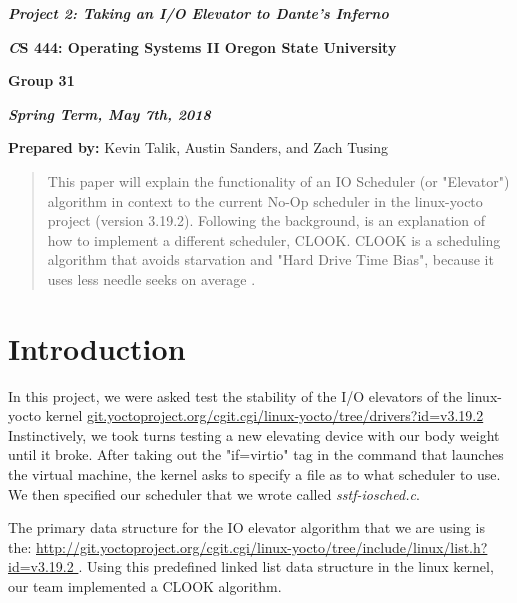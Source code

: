\documentclass[onecolumn, draftclsnofoot,10pt, compsoc]{IEEEtran}
\def \ClassName{		CS 444: Operating Systems II }
\def \TeamNumber{		Group 31}
\def \GroupMemberOne{			Kevin Talik}
\def \GroupMemberTwo{			Austin Sanders}
\def \GroupMemberThree{			Zach Tusing}
\begin{document}
 	\begin{center}
	\huge\bf{ } 
   
    \large\textbf{\textit{ Project 2: Taking an I/O Elevator to Dante's Inferno }}\par
     
    
    
	\small{\bf\textit \ClassName Oregon State University}\par
    \small{\bf{\TeamNumber}}
    
    
    {\bf\textit{ Spring Term, May 7th, 2018} }
    
    
    {\small {\bf Prepared by:} \GroupMemberOne, \GroupMemberTwo, and \GroupMemberThree }
        \end{center}
 		\vfill
		\begin{abstract}
        This paper will explain the functionality of an IO Scheduler (or "Elevator") algorithm in context to the current No-Op scheduler in the linux-yocto project (version 3.19.2). Following the background, is an explanation of how to implement a different scheduler, CLOOK. CLOOK is a scheduling algorithm that avoids starvation and "Hard Drive Time Bias", because it uses less needle seeks on average \cite{iitDiskAlgs:1}.
        \end{abstract}
    
		
       \pagebreak
       \section{Introduction }
		 In this project, we were asked test the stability of the I/O elevators of the linux-yocto kernel \url{git.yoctoproject.org/cgit.cgi/linux-yocto/tree/drivers?id=v3.19.2}
          Instinctively, we took turns testing a new elevating device with our body weight until it broke. After taking out the "if=virtio" tag in the command that launches the virtual machine, the kernel asks to specify a file as to what scheduler to use. We then specified our scheduler that we wrote called \textit{sstf-iosched.c}.

		 The primary data structure for the IO elevator algorithm that we are using is the: \url{http://git.yoctoproject.org/cgit.cgi/linux-yocto/tree/include/linux/list.h?id=v3.19.2 }.
         Using this predefined linked list data structure in the linux kernel, our team implemented a CLOOK algorithm.
\end{document}
